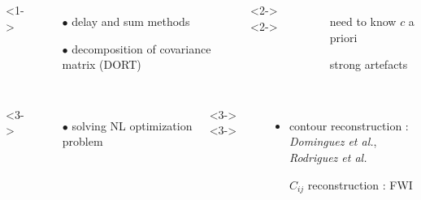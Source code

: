 \documentclass[10pt,xcolor=x11names,compress, notes=show]{beamer}%
\begin{document}
\begin{frame}{\insertsectionhead}
\begin{columns}[c]
	\end{columns}
	\vspace{0.3cm}
	\begin{columns}[c]
			<1->
				\begin{itemize}
					\item[$\bullet$] delay and sum methods
					\item[$\bullet$] decomposition of covariance matrix (DORT)
				\end{itemize}
			<2->
			<2->
				\begin{itemize}
					\item[\ding{55}] need to know $c$ a priori\\
					\item[\ding{55}] strong artefacts
				\end{itemize}
			
	\end{columns}
	\begin{columns}[c]
		<3->
			\begin{itemize}
				\item[$\bullet$] solving NL optimization problem
			\end{itemize}
		<3->
		<3->
			\begin{itemize}
			\item contour reconstruction :\\\hspace{-0.5cm}\small{\emph{Dominguez et al.}, \emph{Rodriguez et al.}}\\[0.1cm]
			\item[\ding{51}] \normalsize{$C_{ij}$ reconstruction : FWI}
		\end{itemize}		
	\end{columns}
\end{frame} 
\end{document}
